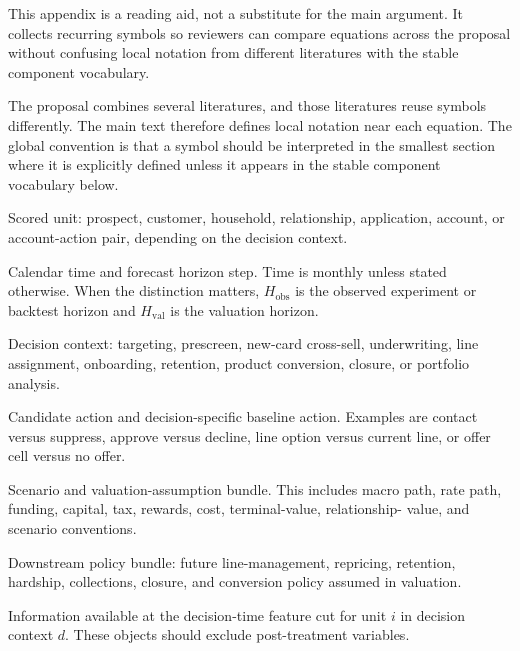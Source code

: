 \documentclass[11pt]{article}
\newcommand{\1}{\mathbf{1}}
\begin{document}
This appendix is a reading aid, not a substitute for the main argument. It
collects recurring symbols so reviewers can compare equations across the
proposal without confusing local notation from different literatures with the
stable component vocabulary.

The proposal combines several literatures, and those literatures reuse symbols
differently. The main text therefore defines local notation near each equation.
The global convention is that a symbol should be interpreted in the smallest
section where it is explicitly defined unless it appears in the stable
component vocabulary below.

\begin{description}[leftmargin=*,style=nextline]
  \item[$i$]
  Scored unit: prospect, customer, household, relationship, application,
  account, or account-action pair, depending on the decision context.

  \item[$t$ and $h$]
  Calendar time and forecast horizon step. Time is monthly unless stated
  otherwise. When the distinction matters, $H_{\mathrm{obs}}$ is the observed
  experiment or backtest horizon and $H_{\mathrm{val}}$ is the valuation
  horizon.

  \item[$d$]
  Decision context: targeting, prescreen, new-card cross-sell, underwriting,
  line assignment, onboarding, retention, product conversion, closure, or
  portfolio analysis.

  \item[$a$ and $a_0(d)$]
  Candidate action and decision-specific baseline action. Examples are contact
  versus suppress, approve versus decline, line option versus current line, or
  offer cell versus no offer.

  \item[$s$]
  Scenario and valuation-assumption bundle. This includes macro path, rate
  path, funding, capital, tax, rewards, cost, terminal-value, relationship-
  value, and scenario conventions.

  \item[$\pi$]
  Downstream policy bundle: future line-management, repricing, retention,
  hardship, collections, closure, and conversion policy assumed in valuation.

  \item[$X_{it}^{d}$ or $\mathcal{I}_{id}$]
  Information available at the decision-time feature cut for unit $i$ in
  decision context $d$. These objects should exclude post-treatment variables.


\end{description}
\end{document}
